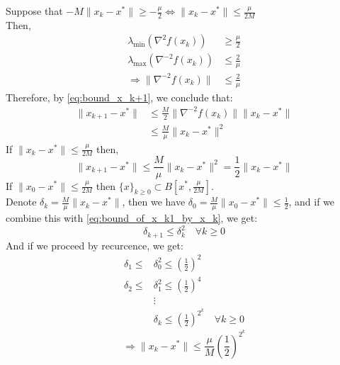 \documentclass[12pt, openany]{report}
\theoremstyle{definition}
\begin{document}
Suppose that $-M \|x_k-x^*\| \geq - \frac{\mu}{2} \Leftrightarrow \|x_k-x^*\| \leq \frac{\mu}{2M}$\\
Then,
\begin{equation}
	\begin{aligned}
		\lambda_{\min}(\nabla^2 f(x_k)) &\geq \frac{\mu}{2}\\
		\lambda_{\max}(\nabla^{-2} f(x_k)) &\leq \frac{2}{\mu}\\
		\Rightarrow \|\nabla^{-2} f(x_k)\| &\leq \frac{2}{\mu}
	\end{aligned}
\end{equation}
Therefore, by \eqref{eq:bound_x_k+1}, we conclude that:
\begin{equation}
	\begin{aligned}
		\|x_{k+1}-x^*\| &\leq \frac{M}{2}\|\nabla^{-2}f(x_k)\|\|x_k-x^*\|\\
		&\leq \frac{M}{\mu}\|x_k-x^*\|^2
	\end{aligned}
\end{equation}
If $\|x_k-x^*\| \leq \frac{\mu}{2M}$ then,
\begin{equation}\label{eq:bound_of_x_k1_by_x_k}
	\|x_{k+1}-x^*\| \leq \frac{M}{\mu} \|x_k - x^*\|^2 = \frac{1}{2} \|x_k - x^*\|
\end{equation}
If $\|x_0-x^*\| \leq \frac{\mu}{2M}$ then $\{x\}_{k\geq0} \subset B[x^*,\frac{\mu}{2M}]$.\\
Denote $\delta_k = \frac{M}{\mu} \|x_k-x^*\|$, then we have $\delta_0 = \frac{M}{\mu} \|x_0-x^*\| \leq \frac{1}{2}$, and if we combine this with \eqref{eq:bound_of_x_k1_by_x_k}, we get:
\begin{equation}
	\delta_{k+1} \leq \delta_k^2 \quad \forall k \geq 0
\end{equation}
And if we proceed by recurcence, we get:
\begin{equation}
	\begin{aligned}
		\delta_1 \leq &\delta_0^2 \leq \left(\frac{1}{2}\right)^2\\
		\delta_2 \leq &\delta_1^2 \leq \left(\frac{1}{2}\right)^4\\
		&\vdots\\
		&\delta_k \leq \left(\frac{1}{2}\right)^{2^k} \quad \forall k \geq 0
	\end{aligned}
\end{equation}
\begin{equation}\label{eq:quadratic_rate_of_convergence}
	\Rightarrow \|x_k-x^*\|\leq \frac{\mu}{M} \left(\frac{1}{2}\right)^{2^k}
\end{equation}
\end{document}
